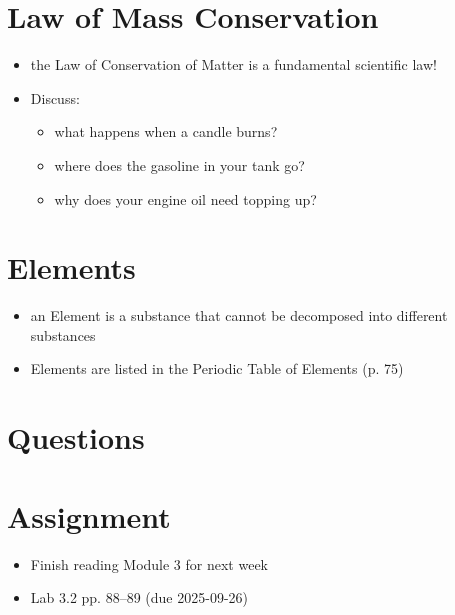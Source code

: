 \documentclass[10pt, oneside]{article}   	%
\begin{document}
\section*{Law of Mass Conservation}
\begin{itemize}
\item the Law of Conservation of Matter is a fundamental scientific law!
\item Discuss:
\begin{itemize}
\item what happens when a candle burns?
\item where does the gasoline in your tank go?
\item why does your engine oil need topping up?
\end{itemize} 
\end{itemize}

\section*{Elements}
\begin{itemize}
\item an Element is a substance that cannot be decomposed into different substances
\item Elements are listed in the Periodic Table of Elements (p. 75)
\end{itemize}

\section*{Questions}

\section*{Assignment}
\begin{itemize}
\item Finish reading Module 3 for next week
\item Lab 3.2 pp. 88--89 (due 2025-09-26)
\end{itemize}
\end{document}

